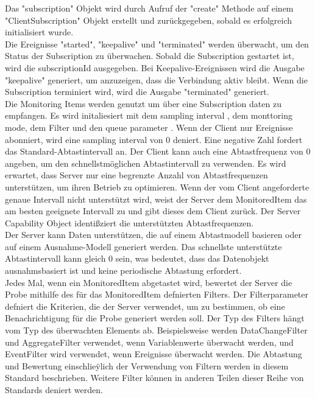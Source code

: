 Das "subscription" Objekt wird durch Aufruf der "create" Methode auf einem "ClientSubscription" Objekt erstellt und zurückgegeben, sobald es erfolgreich initialisiert wurde.\\

Die Ereignisse "started", "keepalive" und "terminated" werden überwacht, um den Status der Subscription zu überwachen. Sobald die Subscription gestartet ist, wird die subscriptionId ausgegeben. Bei Keepalive-Ereignissen wird die Ausgabe "keepalive" generiert, um anzuzeigen, dass die Verbindung aktiv bleibt. Wenn die Subscription terminiert wird, wird die Ausgabe "terminated" generiert.\\


Die Monitoring Items werden genutzt um über eine Subscription daten zu
empfangen. Es wird initaliesiert mit dem \dq sampling interval \dq , dem monttoring mode, dem Filter und den \dq queue parameter \dq . Wenn der Client
nur Ereignisse abonniert, wird eine \dq sampling interval \dq von 0 deniert. Eine
negative Zahl fordert das Standard-Abtastintervall an.
Der Client kann auch eine Abtastfrequenz von 0 angeben, um den schnellstmöglichen Abtastintervall zu verwenden. Es wird erwartet, dass Server nur
eine begrenzte Anzahl von Abtastfrequenzen unterstützen, um ihren Betrieb
zu optimieren. Wenn der vom Client angeforderte genaue Intervall nicht unterstützt wird, weist der Server dem MonitoredItem das am besten geeignete
Intervall zu und gibt dieses dem Client zurück. Der Server Capability Object
identißziert die unterstützten Abtastfrequenzen.\\
Der Server kann Daten unterstützen, die auf einem Abtastmodell basieren oder auf einem Ausnahme-Modell generiert werden. Das schnellste
unterstützte Abtastintervall kann gleich 0 sein, was bedeutet, dass das Datenobjekt ausnahmsbasiert ist und keine periodische Abtastung erfordert.\\
Jedes Mal, wenn ein MonitoredItem abgetastet wird, bewertet der Server
die Probe mithilfe des für das MonitoredItem defnierten Filters. Der Filterparameter defniert die Kriterien, die der Server verwendet, um zu bestimmen, ob eine Benachrichtigung für die Probe generiert werden soll. Der Typ
des Filters hängt vom Typ des überwachten Elements ab. Beispielsweise werden DataChangeFilter und AggregateFilter verwendet, wenn Variablenwerte
überwacht werden, und EventFilter wird verwendet, wenn Ereignisse überwacht werden. Die Abtastung und Bewertung einschlieÿlich der Verwendung
von Filtern werden in diesem Standard beschrieben. Weitere Filter können
in anderen Teilen dieser Reihe von Standards deniert werden.


